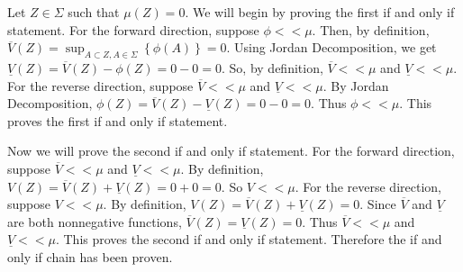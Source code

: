 \begin{solution}
  Let $Z \in \Sigma$ such that $\mu\left( Z \right) = 0$.
  We will begin by proving the first if and only if statement.
  For the forward direction, suppose $\phi < < \mu$.
  Then, by definition, $\overline{V}\left( Z \right) = \sup_{A \subset Z, A \in \Sigma}\left\{ \phi\left( A \right) \right\} = 0$.
  Using Jordan Decomposition, we get $\underline{V}\left( Z \right) = \overline{V}\left( Z \right) - \phi\left( Z \right) = 0 - 0 = 0$.
  So, by definition, $\overline{V} < < \mu$ and $\underline{V} < < \mu$.
  For the reverse direction, suppose $\overline{V} < < \mu$ and $\underline{V} < < \mu$.
  By Jordan Decomposition, $\phi(Z) = \overline{V}\left( Z \right) - \underline{V}\left( Z \right) = 0 - 0 = 0$.
  Thus $\phi < < \mu$.
  This proves the first if and only if statement.

  Now we will prove the second if and only if statement.
  For the forward direction, suppose $\overline{V} < < \mu$ and $\underline{V} < < \mu$.
  By definition, $V(Z) = \overline{V}\left( Z \right) + \underline{V}\left( Z \right) = 0 + 0 = 0$.
  So $V < < \mu$.
  For the reverse direction, suppose $V < < \mu$.
  By definition, $V\left( Z \right) = \overline{V}\left( Z \right) + \underline{V}\left( Z \right) = 0$.
  Since $\overline{V}$ and $\underline{V}$ are both nonnegative functions, $\overline{V}\left( Z \right) = \underline{V}\left( Z \right) = 0$.
  Thus $\overline{V} < < \mu$ and $\underline{V} < < \mu$.
  This proves the second if and only if statement.
  Therefore the if and only if chain has been proven.

\end{solution}
